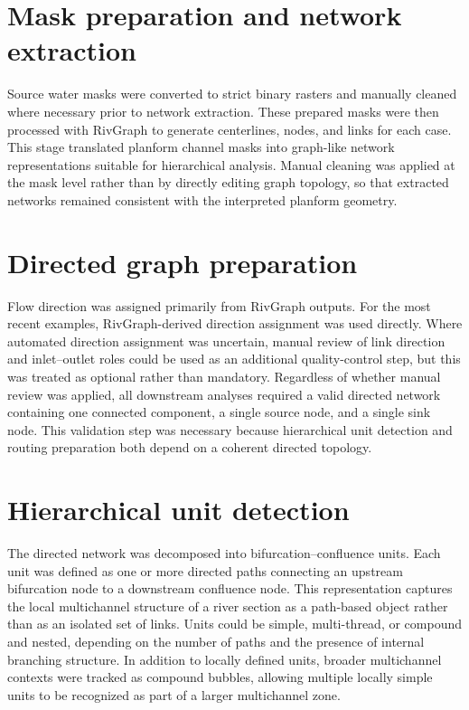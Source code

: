 \documentclass[11pt]{article}
\begin{document}
\section{Mask preparation and network extraction}
Source water masks were converted to strict binary rasters and manually cleaned where necessary prior to network extraction. These prepared masks were then processed with RivGraph to generate centerlines, nodes, and links for each case. This stage translated planform channel masks into graph-like network representations suitable for hierarchical analysis. Manual cleaning was applied at the mask level rather than by directly editing graph topology, so that extracted networks remained consistent with the interpreted planform geometry.

\section{Directed graph preparation}
Flow direction was assigned primarily from RivGraph outputs. For the most recent examples, RivGraph-derived direction assignment was used directly. Where automated direction assignment was uncertain, manual review of link direction and inlet--outlet roles could be used as an additional quality-control step, but this was treated as optional rather than mandatory. Regardless of whether manual review was applied, all downstream analyses required a valid directed network containing one connected component, a single source node, and a single sink node. This validation step was necessary because hierarchical unit detection and routing preparation both depend on a coherent directed topology.

\section{Hierarchical unit detection}
The directed network was decomposed into bifurcation--confluence units. Each unit was defined as one or more directed paths connecting an upstream bifurcation node to a downstream confluence node. This representation captures the local multichannel structure of a river section as a path-based object rather than as an isolated set of links. Units could be simple, multi-thread, or compound and nested, depending on the number of paths and the presence of internal branching structure. In addition to locally defined units, broader multichannel contexts were tracked as compound bubbles, allowing multiple locally simple units to be recognized as part of a larger multichannel zone.
\end{document}
